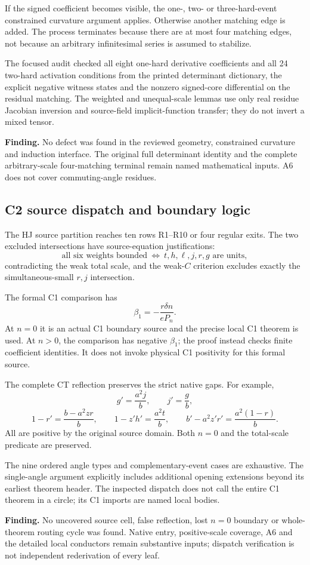 If the signed coefficient becomes visible, the one-, two- or
three-hard-event constrained curvature argument applies. Otherwise
another matching edge is added. The process terminates because
there are at most four matching edges, not because an arbitrary
infinitesimal series is assumed to stabilize.

The focused audit checked all eight one-hard derivative coefficients
and all 24 two-hard activation conditions from the printed determinant
dictionary, the explicit negative witness states and the nonzero
signed-core differential on the residual matching.
The weighted and unequal-scale lemmas use only real residue Jacobian
inversion and source-field implicit-function transfer; they do not
invert a mixed tensor.

\textbf{Finding.}
No defect was found in the reviewed geometry, constrained curvature
and induction interface. The original full determinant identity and
the complete arbitrary-scale four-matching terminal remain named
mathematical inputs. A6 does not cover commuting-angle residues.

\subsection{C2 source dispatch and boundary logic}

The HJ source partition reaches ten rows R1--R10 or four regular exits.
The two excluded intersections have source-equation justifications:
\[
 \text{all six weights bounded}
 \ \Longleftrightarrow\
 t,h,\ell,j,r,g\text{ are units},
\]
contradicting the weak total scale, and the weak-\(C\) criterion
excludes exactly the simultaneous-small \(r,j\) intersection.

The formal C1 comparison has
\[
 \beta_1=-\frac{r\delta n}{eP_n}.
\]
At \(n=0\) it is an actual C1 boundary source and the precise local
C1 theorem is used. At \(n>0\), the comparison has negative
\(\beta_1\); the proof instead checks finite coefficient identities.
It does not invoke physical C1 positivity for this formal source.

The complete CT reflection preserves the strict native gaps. For example,
\[
 g'=\frac{a^2j}{b},\qquad j'=\frac gb,
\]
\[
 1-r'=\frac{b-a^2zr}{b},\qquad
 1-z'h'=\frac{a^2t}{b},\qquad
 b'-a^2z'r'=\frac{a^2(1-r)}b.
\]
All are positive by the original source domain. Both \(n=0\) and the
total-scale predicate are preserved.

The nine ordered angle types and complementary-event cases are
exhaustive. The single-angle argument explicitly includes additional
opening extensions beyond its earliest theorem header.
The inspected dispatch does not call the entire C1 theorem in a circle;
its C1 imports are named local bodies.

\textbf{Finding.}
No uncovered source cell, false reflection, lost \(n=0\) boundary or
whole-theorem routing cycle was found. Native entry, positive-scale
coverage, A6 and the detailed local conductors remain substantive
inputs; dispatch verification is not independent rederivation of
every leaf. \src{Current C2 dispatch audit}

